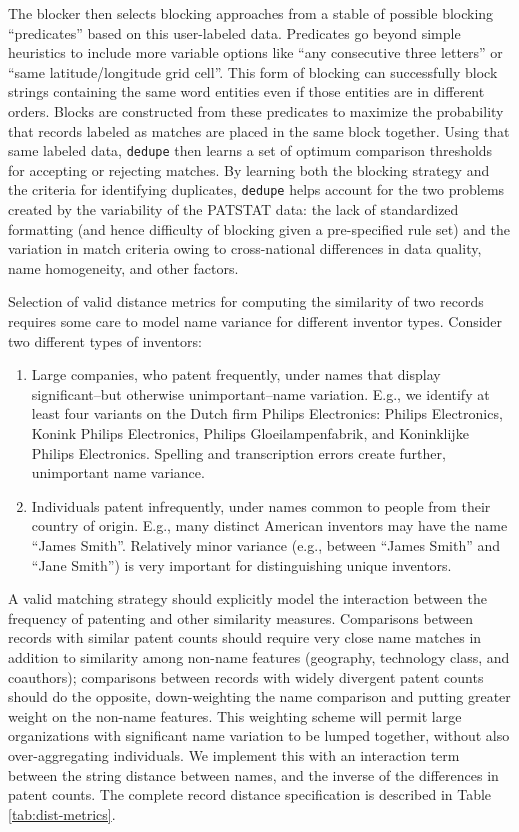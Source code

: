 \documentclass[11pt]{article}
\begin{document}
The blocker then selects blocking approaches from a
stable of possible blocking ``predicates'' based on this user-labeled
data. Predicates go beyond simple
heuristics to include more variable options like ``any consecutive
three letters'' or ``same latitude/longitude grid cell''. This form of
blocking can successfully block strings containing the same word
entities even if those entities are in different orders. Blocks are
constructed from these predicates to maximize the probability that
records labeled as matches are placed in the same block together. Using that
same labeled data, \texttt{dedupe} then learns a set of optimum
comparison thresholds for accepting or rejecting matches. By learning
both the blocking strategy and the criteria for identifying
duplicates, \texttt{dedupe} helps account for the two problems created
by the variability of the PATSTAT data: the lack of standardized
formatting (and hence difficulty of blocking given a pre-specified
rule set) and the variation in match criteria owing to cross-national
differences in data quality, name homogeneity, and other factors.

Selection of valid distance metrics for computing the similarity of
two records requires some care to model name variance for different
inventor types. Consider two different types of inventors:

\begin{enumerate}
\item Large companies, who patent frequently, under names that display
  significant--but otherwise unimportant--name variation. E.g., we
  identify at least four variants on the Dutch firm Philips
  Electronics: Philips Electronics, Konink Philips Electronics, Philips
Gloeilampenfabrik, and Koninklijke Philips Electronics. Spelling and
transcription errors create further, unimportant name variance.
\item Individuals patent infrequently, under names common
  to people from their country of origin. E.g., many distinct American
  inventors may have the name ``James Smith''. Relatively minor
  variance (e.g., between ``James Smith'' and ``Jane Smith'') is very
  important for distinguishing unique inventors.
\end{enumerate}

A valid matching strategy should explicitly model the interaction between
the frequency of patenting and other similarity measures. Comparisons
between records with similar patent counts should require very close name
matches in addition to similarity among non-name features (geography,
technology class, and coauthors); comparisons between records with
widely divergent patent counts should do the opposite, down-weighting
the name comparison and putting greater weight on the non-name
features. This weighting scheme will permit large organizations with
significant name variation to be lumped together, without also
over-aggregating individuals. We implement this with an interaction
term between the string distance between names, and the inverse of the
differences in patent counts. The complete record distance specification
is described in Table \ref{tab:dist-metrics}.
\end{document}
